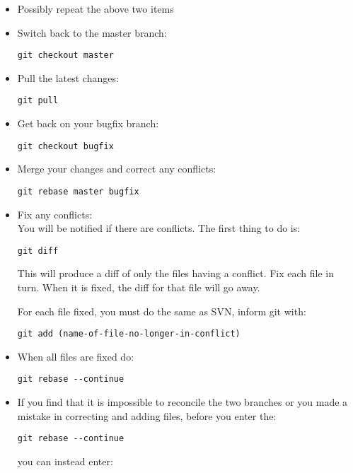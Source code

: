 \begin{itemize}
\item Possibly repeat the above two items

\item Switch back to the master branch:\\
\begin{verbatim}
git checkout master
\end{verbatim}

\item Pull the latest changes:\\
\begin{verbatim}
git pull
\end{verbatim}

\item Get back on your bugfix branch:\\
\begin{verbatim}
git checkout bugfix
\end{verbatim}

\item Merge your changes and correct any conflicts:\\
\begin{verbatim}
git rebase master bugfix
\end{verbatim}

\item Fix any conflicts:\\
You will be notified if there are conflicts. The first
thing to do is:

\begin{verbatim}
git diff
\end{verbatim}

This will produce a diff of only the files having a conflict.
Fix each file in turn. When it is fixed, the diff for that file
will go away. 

For each file fixed, you must do the same as SVN, inform git with:

\begin{verbatim}
git add (name-of-file-no-longer-in-conflict)
\end{verbatim}

\item When all files are fixed do:
\begin{verbatim}
git rebase --continue
\end{verbatim}

\item If you find that it is impossible to reconcile the two
      branches or you made a mistake in correcting and adding files,
before you enter the:
\begin{verbatim}
git rebase --continue
\end{verbatim}
you can instead enter:


\end{itemize}
